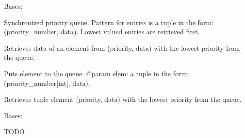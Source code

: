 \documentclass[a4paper,11pt,openany]{sphinxmanual}
\begin{document}
\begin{fulllineitems}
\label{ref-manual/XrdTest:XrdTest.SocketUtils.PriorityBlockingQueue}
Bases: 

Synchronized priority queue.
Pattern for entries is a tuple in the form: (priority\_number, data).
Lowest valued entries are retrieved first.

\begin{fulllineitems}
\label{ref-manual/XrdTest:XrdTest.SocketUtils.PriorityBlockingQueue.get}
Retrieves data of an element from (priority, data)
with the lowest priority from the queue.

\end{fulllineitems}


\begin{fulllineitems}
\label{ref-manual/XrdTest:XrdTest.SocketUtils.PriorityBlockingQueue.put}
Puts element to the queue.
@param elem: a tuple in the form: (priority\_number{[}int{]}, data).

\end{fulllineitems}


\begin{fulllineitems}
\label{ref-manual/XrdTest:XrdTest.SocketUtils.PriorityBlockingQueue.rawGet}
Retrieves tuple element (priority, data)
with the lowest priority from the queue.

\end{fulllineitems}


\end{fulllineitems}


\begin{fulllineitems}
\label{ref-manual/XrdTest:XrdTest.SocketUtils.SocketDisconnectedError}
Bases: 

TODO

\end{fulllineitems}
\end{document}
